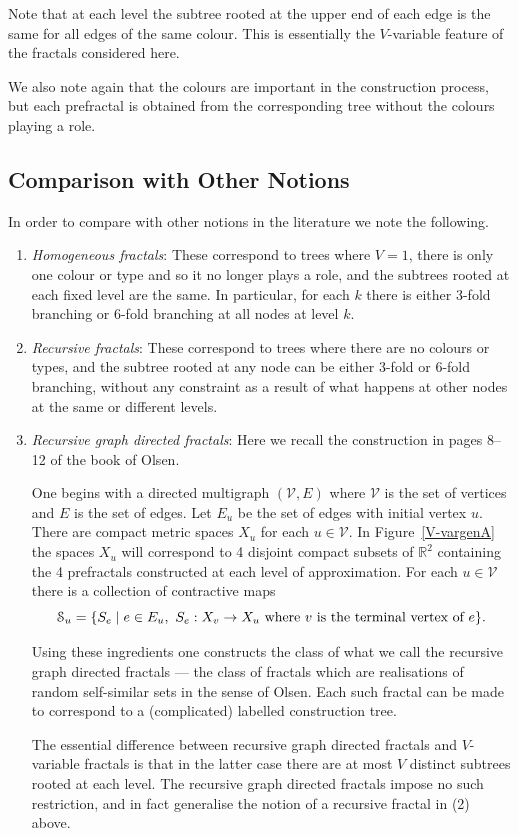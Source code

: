 \documentclass[a4paper]{amsart}
\theoremstyle{plain}
\theoremstyle{definition}
\theoremstyle{remark}
\begin{document}
Note that at each level the subtree rooted at the upper end of each edge is the same for all edges of the same colour.  This is essentially the $ V $-variable feature of the fractals considered here.

We also note again that the colours are important in the construction process, but each prefractal is obtained from the corresponding tree without the colours playing a role.   

\subsection{Comparison with Other Notions}
In order to compare with other notions in the literature we note the following.  

\begin{enumerate}
\item \emph{Homogeneous fractals}: These correspond to trees where $ V=1 $, there is only one colour or type and so it no longer plays a role, and the subtrees rooted at each fixed level are the same.  In particular, for each $ k $ there is either 3-fold branching or 6-fold branching at all nodes at level $ k $. 

\item \emph{Recursive fractals}:  These correspond to trees where there are no colours  or types, and the subtree rooted at any node can be either 3-fold or 6-fold branching, without any constraint as a result of what happens at other nodes at the same or different levels.

\item \emph{Recursive graph directed fractals}:  Here we recall the construction in pages 8--12 of the book of Olsen.  

One begins with a directed multigraph $ (\mathcal{V} , E ) $ where $ \mathcal{V} $ is the set of vertices and  $ E$ is the set of edges. Let $ E_u $ be the set of edges with initial vertex $ u $.
There are compact metric spaces $ X_u $ for each   
$ u \in \mathcal{V} $. In Figure~\ref{V-vargenA} the spaces $ X_u $ will correspond to 4 disjoint compact subsets of $ \mathbb{R}^2 $ containing the 4 prefractals constructed at each level of approximation.  
For each  $ u \in \mathcal{V} $   there is   a collection of contractive maps 
\[
\mathcal{S}_u = \{ S_e  \mid   e\in E_u ,\ S_e : X_{v} \to X_u \text{ where $v $ is the terminal vertex of $ e $} \}.
\]

Using these ingredients     one constructs the class of what we call the recursive graph directed fractals ---  the class of fractals   which  are realisations of random self-similar sets in the sense of Olsen.   Each such fractal can be made to correspond  to a (complicated) labelled construction tree.

The essential difference between recursive graph directed fractals and $ V $-variable fractals is that in the latter case there are at most $ V $ distinct subtrees rooted at each level.  The recursive graph directed fractals impose no such restriction, and in fact generalise    the notion of  a recursive  fractal in (2) above.
\end{enumerate} 
\end{document}
